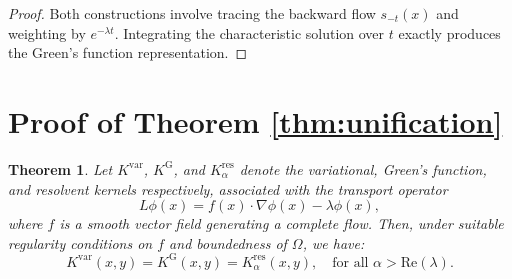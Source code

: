 \documentclass[11pt]{article}
\theoremstyle{plain}
\newtheorem{theorem}{Theorem}[section]
\def\[{\begin{equation}}
\def\]{\end{equation}}
\begin{document}
\begin{proof}
Both constructions involve tracing the backward flow $s_{-t}(x)$ and weighting by $e^{-\lambda t}$. Integrating the characteristic solution over $t$ exactly produces the Green's function representation. 
\end{proof}







 \section{Proof of Theorem \ref{thm:unification}}
\label{sect:proof_thm_unification}

\begin{theorem}
Let $K^{\mathrm{var}}$, $K^{\mathrm{G}}$, and $K^{\mathrm{res}}_\alpha$ denote the variational, Green's function, and resolvent kernels respectively, associated with the transport operator
\[
L\phi(x) = f(x) \cdot \nabla \phi(x) - \lambda \phi(x),
\]
where $f$ is a smooth vector field generating a complete flow. Then, under suitable regularity conditions on $f$ and boundedness of $\Omega$, we have:
\[
K^{\mathrm{var}}(x, y) = K^{\mathrm{G}}(x, y) = K^{\mathrm{res}}_\alpha(x, y), \quad \text{for all } \alpha > \mathrm{Re}(\lambda).
\]
\end{theorem}
\end{document}
